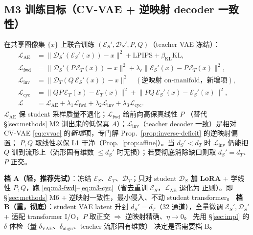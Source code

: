 \documentclass[11pt,a4paper]{article}
\newcommand{\loss}{\mathcal{L}}
\newcommand{\KL}{\mathrm{KL}}
\newcommand{\Enc}{\mathcal{E}}
\newcommand{\Dec}{\mathcal{D}}
\theoremstyle{definition}
\begin{document}
\subsection{M3 训练目标（CV-VAE + 逆映射 decoder 一致性）}
在共享图像集 $\{x\}$ 上联合训练 $(\Enc_S',\Dec_S',P,Q)$（teacher VAE 冻结）：
\begin{align}
\loss_{\mathrm{AE}}  &= \lVert \Dec_S'(\Enc_S'(x))-x\rVert^2 + \mathrm{LPIPS} + \beta_{\mathrm{KL}}\KL, \label{eq:m3-ae}\\
\loss_{\mathrm{fwd}} &= \lVert \Dec_S'(P\,\Enc_T(x))-x\rVert^2 + \lambda_\ell\lVert \Enc_S'(x)-P\,\Enc_T(x)\rVert^2, \label{eq:m3-fwd}\\
\loss_{\mathrm{inv}} &= \lVert \Dec_T(Q\,\Enc_S'(x))-x\rVert^2 \quad(\text{逆映射 on-manifold，新增项}), \label{eq:m3-inv}\\
\loss_{\mathrm{cyc}} &= \lVert QP\,\Enc_T(x)-\Enc_T(x)\rVert^2 + \lVert PQ\,\Enc_S'(x)-\Enc_S'(x)\rVert^2, \label{eq:m3-cyc}\\
\loss &= \loss_{\mathrm{AE}} + \lambda_1\loss_{\mathrm{fwd}} + \lambda_2\loss_{\mathrm{inv}} + \lambda_3\loss_{\mathrm{cyc}} . \label{eq:m3-total}
\end{align}
$\loss_{\mathrm{AE}}$ 保 student 采样质量不退化；$\loss_{\mathrm{fwd}}$ 给前向高保真线性 $P$
（替代 §\ref{sec:methods} M2 训出来的低保真 $A$）；$\loss_{\mathrm{inv}}$（teacher decoder 一致）是相对
CV-VAE \eqref{eq:cvvae} 的\emph{新增}项，专门解 Prop.~\ref{prop:inverse-deficit} 的逆映射偏置；
$P,Q$ 取线性以保 L1 干净（Prop.~\ref{prop:affine}）。当 $d_S'<d_T$ 时 $\loss_{\mathrm{inv}}$ 仍能把 $Q$
训到流形上（流形固有维数 $\le d_S'$ 时无损）；若要彻底消除缺口则取 $d_S'{=}d_T$、$P$ 正交。

\begin{tcolorbox}[colback=green!5,colframe=green!50!black,title=M3 落地建议（两档）]
\textbf{档 A（轻，推荐先试）}：冻结 $\Enc_S$、$\Enc_T$、$\Dec_T$；只对 student \textbf{$\Dec_S$ 加 LoRA}
+ 学线性 $P,Q$，跑 \eqref{eq:m3-fwd}--\eqref{eq:m3-cyc}（省去重训 $\Enc_S$，$\loss_{\mathrm{AE}}$ 退化为
正则）。即 §\ref{sec:methods} M6 + 逆映射一致性，最小侵入、不动 student transformer。
\textbf{档 B（重，彻底）}：student VAE latent 升到 $d_S'{=}d_T$（32 通道），全量微调 $\Enc_S',\Dec_S'$
+ 适配 transformer I/O，$P$ 取正交 $\Rightarrow$ 逆映射精确、$\eta\to0$。
先用 §\ref{sec:impl} 的 $\delta$ 体检（量 $\delta_{\mathrm{VAE}}$、$\delta_{\mathrm{align}}$、teacher 流形固有维数）
决定是否需要档 B。
\end{tcolorbox}

\end{document}
